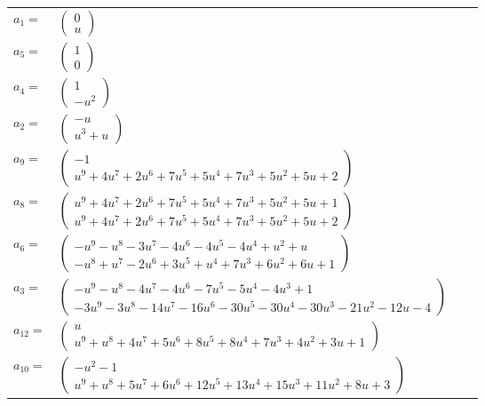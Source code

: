 \documentclass[1p]{elsarticle_modified}
\theoremstyle{definition}
\begin{document}
\begin{tabular}{m{7pt} m{180pt} m{7pt} m{180pt} }
\flushright $a_{1}=$&$\begin{pmatrix}0\\u\end{pmatrix}$ \\
\flushright $a_{5}=$&$\begin{pmatrix}1\\0\end{pmatrix}$ \\
\flushright $a_{4}=$&$\begin{pmatrix}1\\- u^2\end{pmatrix}$ \\
\flushright $a_{2}=$&$\begin{pmatrix}- u\\u^3+u\end{pmatrix}$ \\
\flushright $a_{9}=$&$\begin{pmatrix}-1\\u^9+4 u^7+2 u^6+7 u^5+5 u^4+7 u^3+5 u^2+5 u+2\end{pmatrix}$ \\
\flushright $a_{8}=$&$\begin{pmatrix}u^9+4 u^7+2 u^6+7 u^5+5 u^4+7 u^3+5 u^2+5 u+1\\u^9+4 u^7+2 u^6+7 u^5+5 u^4+7 u^3+5 u^2+5 u+2\end{pmatrix}$ \\
\flushright $a_{6}=$&$\begin{pmatrix}- u^9- u^8-3 u^7-4 u^6-4 u^5-4 u^4+u^2+u\\- u^8+u^7-2 u^6+3 u^5+u^4+7 u^3+6 u^2+6 u+1\end{pmatrix}$ \\
\flushright $a_{3}=$&$\begin{pmatrix}- u^9- u^8-4 u^7-4 u^6-7 u^5-5 u^4-4 u^3+1\\-3 u^9-3 u^8-14 u^7-16 u^6-30 u^5-30 u^4-30 u^3-21 u^2-12 u-4\end{pmatrix}$ \\
\flushright $a_{12}=$&$\begin{pmatrix}u\\u^9+u^8+4 u^7+5 u^6+8 u^5+8 u^4+7 u^3+4 u^2+3 u+1\end{pmatrix}$ \\
\flushright $a_{10}=$&$\begin{pmatrix}- u^2-1\\u^9+u^8+5 u^7+6 u^6+12 u^5+13 u^4+15 u^3+11 u^2+8 u+3\end{pmatrix}$ \\

\end{tabular}
\end{document}
